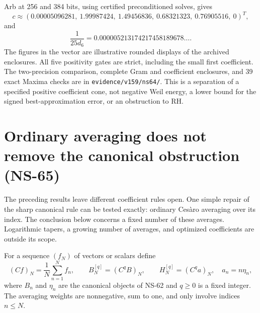 Arb at 256 and 384 bits, using certified preconditioned solves, gives
\[
 c\approx(0.00005096281,\ 1.99987424,\ 1.49456836,\
            0.68321323,\ 0.76905516,\ 0)^T,
\]
and
\[
 \frac1{25d_6}=0.000005213174217458189678\ldots.
\]
The figures in the vector are illustrative rounded displays of the
archived enclosures. All five positivity gates are strict, including
the small first coefficient. The two-precision comparison, complete
Gram and coefficient enclosures, and 39 exact Maxima checks are in
\texttt{evidence/v159/ns64/}. This is a separation of a specified
positive coefficient cone, not negative Weil energy, a lower bound for
the signed best-approximation error, or an obstruction to RH.

\section{Ordinary averaging does not remove the canonical obstruction (NS-65)}
\label{sec:ns65-cesaro}

The preceding results leave different coefficient rules open. One simple
repair of the sharp canonical rule can be tested exactly: ordinary
Ces\`aro averaging over its index. The conclusion below concerns a fixed
number of these averages. Logarithmic tapers, a growing number of averages,
and optimized coefficients are outside its scope.

For a sequence $(f_N)$ of vectors or scalars define
\[
 (Cf)_N=\frac1N\sum_{n=1}^Nf_n,\qquad
 B_N^{[q]}=(C^qB)_N,\qquad
 H_N^{[q]}=(C^q a)_N,\quad a_n=n\eta_n,
\]
where $B_n$ and $\eta_n$ are the canonical objects of NS-62 and
$q\geq0$ is a fixed integer. The averaging weights are nonnegative,
sum to one, and only involve indices $n\leq N$.

